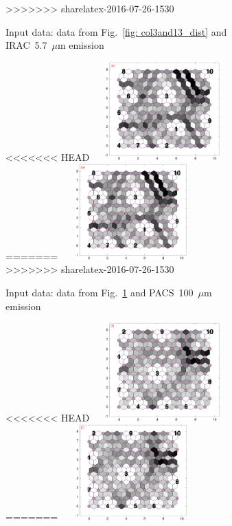 \begin{figure}
\begin{subfigure}[b]{0.25\textwidth}
>>>>>>> sharelatex-2016-07-26-1530
        \caption{Input data: data from Fig.~\ref{fig: col3and13_dist} and IRAC~5.7~$\mu$m emission}
        \label{fig: col3and14_dist}
    \end{subfigure}
        \hfill
    \begin{subfigure}[b]{0.25\textwidth}
        \centering
<<<<<<< HEAD
        \includegraphics[width=54mm, height=38mm]{../../images0.01/M31/2D/diff_dimension/combine_2D_data_between_cols3and15.png}
=======
        \includegraphics[width=54mm, height=37mm]{../../images0.01/M31/2D/diff_dimension/combine_2D_data_between_cols3and15.png}
>>>>>>> sharelatex-2016-07-26-1530
        \caption{Input data: data from Fig.~\ref{fig: col3and14_dist} and PACS~100~$\mu$m emission }
        \label{fig: col3and15_dist}
    \end{subfigure}
        \hfill
    \begin{subfigure}[b]{0.25\textwidth}
        \centering
<<<<<<< HEAD
        \includegraphics[width=54mm, height=38mm]{../../images0.01/M31/2D/diff_dimension/combine_2D_data_between_cols3and16.png}
=======
        \includegraphics[width=54mm, height=37mm]{../../images0.01/M31/2D/diff_dimension/combine_2D_data_between_cols3and16.png}

\end{subfigure}
\end{figure}
